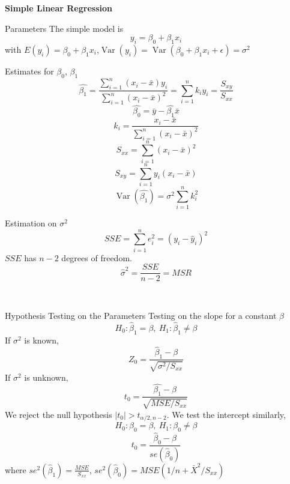 \documentclass{article}
\title{}
\DeclareMathOperator{\Var}{Var}
\begin{document}
\begin{center}{\large{\textbf{Simple Linear Regression}}}\\
\end{center}




\begin{multicols*}{3}

    \begin{blackbox}{Parameters}
        The simple model is \\[-3ex]
        \[y_i = \beta_0 + \beta_1x_i\]
        with $E(y_i) = \beta_0 + \beta_1x_i$,$\Var(y_i) = \Var(\beta_0 + \beta_1x_i + \epsilon) = \sigma^2$
        \begin{redbox}{Estimates for $\beta_0$, $\beta_1$}
            \[\hat{\beta_1}= \frac{\sum_{i=1}^n(x_i - \bar{x})y_i}{\sum_{i=1}^n (x_i - \bar{x})^2} = \sum_{i=1}^n k_iy_i = \frac{S_{xy}}{S_{xx}}\]
            \[\hat{\beta_0} = \bar{y} - \hat{\beta_1}\bar{x}\]
            \[k_i = \frac{x_i - \bar{x}}{\sum_{i=1}^n(x_i - \bar{x})^2}\]
            \[S_{xx} = \sum_{i=1}^n (x_i - \bar{x})^2\]
            \[S_{xy} = \sum_{i=1}^n y_i(x_i - \bar{x})\]
            \[\Var(\hat{\beta_1}) = \sigma^2\sum_{i=1}^nk_i^2\]
        \end{redbox}
        \begin{bluebox}{Estimation on $\sigma^2$}
            \[SSE = \sum_{i=1}^ne_i^2 = (y_i-\hat{y}_i)^2\]
            $SSE$ has $n-2$ degrees of freedom.
            \[\hat{\sigma}^2 = \frac{SSE}{n-2} = MSR\]
        \end{bluebox}\\[-2ex]
    \end{blackbox}
    \begin{blackbox}{Hypothesis Testing on the Parameters}
        Testing on the slope for a constant $\beta$
        \[H_0: \hat{\beta}_1 = \beta, \ H_1: \hat{\beta}_1 \neq \beta\]
        If $\sigma^2$ is known,\\[-3ex]
        \[Z_0 = \frac{\hat{\beta}_1 - \beta}{\sqrt{\sigma^2/S_{xx}}}\]
        If $\sigma^2$ is unknown,\\[-4ex]
        \[t_0 = \frac{\hat{\beta_1} - \beta}{\sqrt{MSE/S_{xx}}}\]
        We reject the null hypothesis $|t_0| > t_{\alpha/2, n-2}$. We test the intercept similarly,\\[-2ex]
        \[H_0: \beta_0 = \beta, \ H_1: \beta_0 \neq \beta\]
        \[t_0 = \frac{\hat{\beta}_0 -  \beta}{se(\hat{\beta}_0)}\]
        where $se^2(\hat{\beta}_1) = \frac{MSE}{S_{xx}}$, $se^2(\hat{\beta}_0) = MSE(1/n + \bar{X}^2/S_{xx})$

\end{blackbox}
\end{multicols*}
\end{document}
